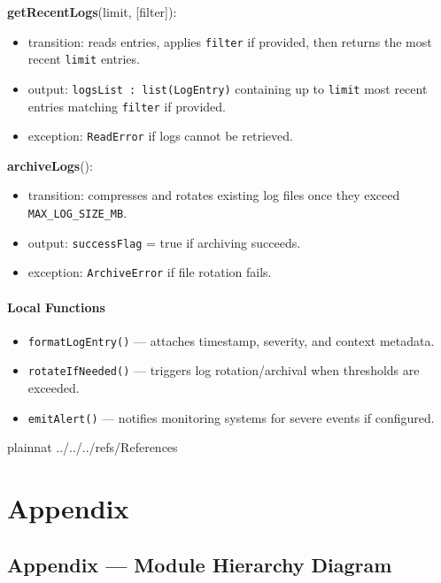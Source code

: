 \documentclass[12pt, titlepage]{article}
\begin{document}
\begin{itemize}
  \noindent \textbf{getRecentLogs}(limit, [filter]):
  \begin{itemize}
    \item transition: reads entries, applies \texttt{filter} if provided, then returns the most recent \texttt{limit} entries.
    \item output: \texttt{logsList : list(LogEntry)} containing up to \texttt{limit} most recent entries matching \texttt{filter} if provided.
    \item exception: \texttt{ReadError} if logs cannot be retrieved.
  \end{itemize}



  \noindent \textbf{archiveLogs}():
  \begin{itemize}
    \item transition: compresses and rotates existing log files once they exceed \texttt{MAX\_LOG\_SIZE\_MB}.
    \item output: \texttt{successFlag} = true if archiving succeeds.
    \item exception: \texttt{ArchiveError} if file rotation fails.
  \end{itemize}

  \paragraph{Local Functions}
  \begin{itemize}
    \item \texttt{formatLogEntry()} — attaches timestamp, severity, and context metadata.
    \item \texttt{rotateIfNeeded()} — triggers log rotation/archival when thresholds are exceeded.
    \item \texttt{emitAlert()} — notifies monitoring systems for severe events if configured.
  \end{itemize}



\newpage

 {plainnat}
 {../../../refs/References}

\newpage

\section{Appendix} \label{Appendix}
\subsection{Appendix --- Module Hierarchy Diagram}


\end{itemize}
\end{document}
